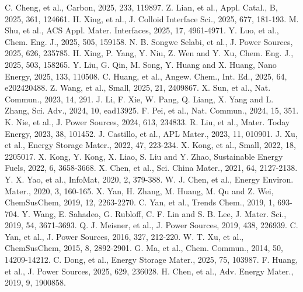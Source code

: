 \documentclass[12pt,a4paper,twocolumn]{article} %
\newcommand{\english}[1]{\textenglish{#1}}
\begin{document}
 \english{C. Cheng, et al., Carbon, 2025, 233, 119897.}
 \english{Z. Lian, et al., Appl. Catal., B, 2025, 361, 124661.}
 \english{H. Xing, et al., J. Colloid Interface Sci., 2025, 677, 181-193.}
 \english{M. Shu, et al., ACS Appl. Mater. Interfaces, 2025, 17, 4961-4971.}
 \english{Y. Luo, et al., Chem. Eng. J., 2025, 505, 159158.}
 \english{N. B. Songwe Selabi, et al., J. Power Sources, 2025, 626, 235785.}
 \english{H. Xing, P. Yang, Y. Niu, Z. Wen and Y. Xu, Chem. Eng. J., 2025, 503, 158265.}
 \english{Y. Liu, G. Qin, M. Song, Y. Huang and X. Huang, Nano Energy, 2025, 133, 110508.}
 \english{C. Huang, et al., Angew. Chem., Int. Ed., 2025, 64, e202420488.}
 \english{Z. Wang, et al., Small, 2025, 21, 2409867.}
 \english{X. Sun, et al., Nat. Commun., 2023, 14, 291.}
 \english{J. Li, F. Xie, W. Pang, Q. Liang, X. Yang and L. Zhang, Sci. Adv., 2024, 10, ead13925.}
 \english{F. Pei, et al., Nat. Commun., 2024, 15, 351.}
 \english{K. Nie, et al., J. Power Sources, 2024, 613, 234833.}
 \english{R. Liu, et al., Mater. Today Energy, 2023, 38, 101452.}
 \english{J. Castillo, et al., APL Mater., 2023, 11, 010901.}
 \english{J. Xu, et al., Energy Storage Mater., 2022, 47, 223-234.}
 \english{X. Kong, et al., Small, 2022, 18, 2205017.}
 \english{X. Kong, Y. Kong, X. Liao, S. Liu and Y. Zhao, Sustainable Energy Fuels, 2022, 6, 3658-3668.}
 \english{X. Chen, et al., Sci. China Mater., 2021, 64, 2127-2138.}
 \english{Y. X. Yao, et al., InfoMat, 2020, 2, 379-388.}
 \english{W. J. Chen, et al., Energy Environ. Mater., 2020, 3, 160-165.}
 \english{X. Yan, H. Zhang, M. Huang, M. Qu and Z. Wei, ChemSusChem, 2019, 12, 2263-2270.}
 \english{C. Yan, et al., Trends Chem., 2019, 1, 693-704.}
 \english{Y. Wang, E. Sahadeo, G. Rubloff, C. F. Lin and S. B. Lee, J. Mater. Sci., 2019, 54, 3671-3693.}
 \english{Q. J. Meisner, et al., J. Power Sources, 2019, 438, 226939.}
 \english{C. Yan, et al., J. Power Sources, 2016, 327, 212-220.}
 \english{W. T. Xu, et al., ChemSusChem, 2015, 8, 2892-2901.}
 \english{G. Ma, et al., Chem. Commun., 2014, 50, 14209-14212.}
 \english{C. Dong, et al., Energy Storage Mater., 2025, 75, 103987.}
 \english{F. Huang, et al., J. Power Sources, 2025, 629, 236028.}
 \english{H. Chen, et al., Adv. Energy Mater., 2019, 9, 1900858.}


\end{document}
